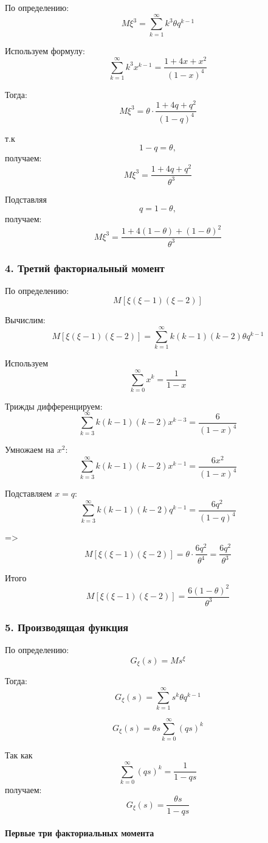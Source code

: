 \documentclass[12pt,a4paper]{article}
\theoremstyle{definition}
\begin{document}
По определению:
\[M\xi^3=\sum_{k=1}^{\infty}k^3\theta q^{k-1}\]

Используем формулу:
\[\sum_{k=1}^{\infty}k^3x^{k-1}=\frac{1+4x+x^2}{(1-x)^4}\]

Тогда:
\[M\xi^3=\theta\cdot\frac{1+4q+q^2}{(1-q)^4}\]

т.к
\[1-q=\theta,\]
получаем:
\[M\xi^3=\frac{1+4q+q^2}{\theta^3}\]

Подставляя
\[q=1-\theta,\]
получаем:
\[\boxed{M\xi^3=\frac{1+4(1-\theta)+(1-\theta)^2}{\theta^3}}\]

\subsubsection*{4. Третий факториальный момент}

По определению:
\[M[\xi(\xi-1)(\xi-2)]\]

Вычислим:
\[M[\xi(\xi-1)(\xi-2)]=\sum_{k=1}^{\infty}k(k-1)(k-2)\theta q^{k-1}\]

Используем
\[\sum_{k=0}^{\infty}x^k=\frac1{1-x}\]

Трижды дифференцируем:
\[\sum_{k=3}^{\infty}k(k-1)(k-2)x^{k-3}=\frac{6}{(1-x)^4}\]

Умножаем на $x^2$:
\[\sum_{k=3}^{\infty}k(k-1)(k-2)x^{k-1}=\frac{6x^2}{(1-x)^4}\]

Подставляем $x=q$:
\[\sum_{k=3}^{\infty}k(k-1)(k-2)q^{k-1}=\frac{6q^2}{(1-q)^4}\]

=>
\[M[\xi(\xi-1)(\xi-2)]=\theta\cdot\frac{6q^2}{\theta^4}=\frac{6q^2}{\theta^3}\]

Итого
\[\boxed{M[\xi(\xi-1)(\xi-2)]=\frac{6(1-\theta)^2}{\theta^3}}\]

\subsubsection*{5. Производящая функция}

По определению:
\[G_\xi(s)=Ms^\xi\]

Тогда:
\[G_\xi(s)=\sum_{k=1}^{\infty}s^k\theta q^{k-1}\]

\[G_\xi(s)=\theta s\sum_{k=0}^{\infty}(qs)^k\]

Так как
\[\sum_{k=0}^{\infty}(qs)^k=\frac1{1-qs}\]
получаем:
\[\boxed{G_\xi(s)=\frac{\theta s}{1-qs}}\]

\paragraph{Первые три факториальных момента}
\end{document}
